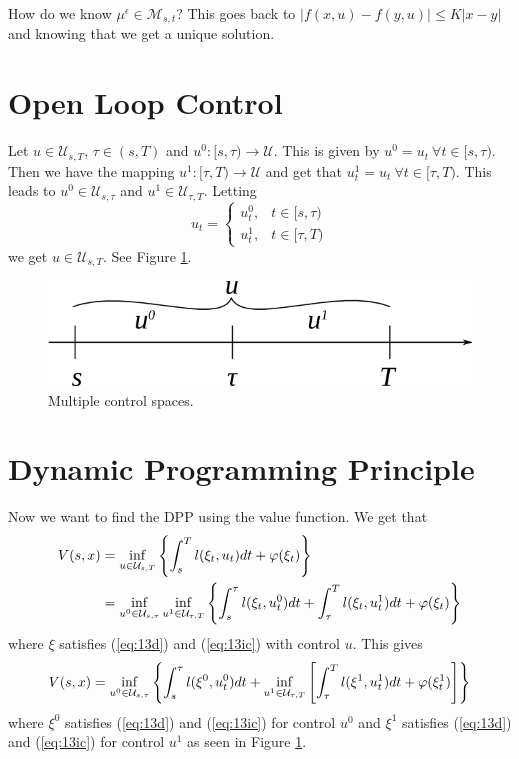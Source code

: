 How do we know $\mu^\epsilon\in\mathcal{M}_{s,t}$? This goes back to $|f(x,u)-f(y,u)|\leq K|x-y|$ and knowing that we get a unique solution.

\section{Open Loop Control}
Let $u\in\mathcal{U}_{s,T}$, $\tau\in(s,T)$ and $u^0:[s,\tau)\to\mathcal{U}$. This is given by $u^0=u_t ~\forall t\in[s,\tau)$. Then we have the mapping $u^1: [\tau,T)\to\mathcal{U}$ and get that $u^1_t=u_t ~\forall t\in[\tau,T)$. This leads to $u^0\in\mathcal{U}_{s,\tau}$ and $u^1\in\mathcal{U}_{\tau,T}$. Letting
$$u_t=\begin{cases} u_t^0, & t\in[s,\tau) \\ u_t^1, & t\in[\tau,T) \end{cases}$$
we get $u\in\mathcal{U}_{s,T}$. See Figure \ref{fig:13controlspace}.

\begin{figure}[ht!]
	\centering
	\includegraphics[width=.5\textwidth]{images/13controlspace}
	\caption{Multiple control spaces.}
	\label{fig:13controlspace}
\end{figure}

\section{Dynamic Programming Principle}
Now we want to find the DPP using the value function. We get that
\begin{align*}
V(s,x) &= \inf_{u\in\mathcal{U}_{s,T}} \left\lbrace \int_s^T l(\xi_t,u_t)dt + \varphi(\xi_t) \right\rbrace \\
&= \inf_{u^0\in\mathcal{U}_{s,\tau}} \inf_{u^1\in\mathcal{U}_{\tau,T}} \left\lbrace \int_s^\tau l(\xi_t,u_t^0)dt + \int_\tau^T l(\xi_t,u_t^1)dt + \varphi(\xi_t) \right\rbrace
\end{align*}
where $\xi$ satisfies (\ref{eq:13d}) and (\ref{eq:13ic}) with control $u$. This gives
\begin{align*}
V(s,x) = \inf_{u^0\in\mathcal{U}_{s,\tau}} \left\lbrace \int_s^\tau l(\xi^0,u_t^0)dt + \inf_{u^1\in\mathcal{U}_{\tau,T}} \left[\int_\tau^T l(\xi^1,u_t^1)dt + \varphi(\xi_t^1)\right]\right\rbrace
\end{align*}
where $\xi^0$ satisfies (\ref{eq:13d}) and (\ref{eq:13ic}) for control $u^0$ and $\xi^1$ satisfies (\ref{eq:13d}) and (\ref{eq:13ic}) for control $u^1$ as seen in Figure \ref{fig:13controlspace}.

